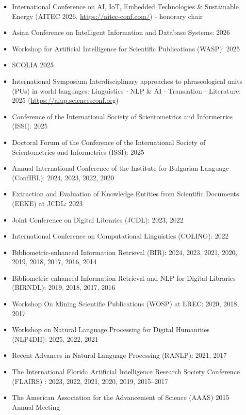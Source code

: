 \begin{itemize}
	\item International Conference on AI, IoT, Embedded Technologies \& Sustainable Energy (AITEC 2026, \url{https://aitec-conf.com/}) - honorary chair 
	\item Asian Conference on Intelligent Information and Database Systems: 2026
	\item Workshop for Artificial Intelligence for Scientific Publications (WASP): 2025 
    \item SCOLIA 2025
    \item International Symposium Interdisciplinary approaches to phraseological units (PUs) in world languages: Linguistics - NLP \& AI - Translation - Literature: 2025 (\url{https://aiup.sciencesconf.org})
    \item Conference of the International Society of Scientometrics and Informetrics (ISSI): 2025
    \item Doctoral Forum of the Conference of the International Society of Scientometrics and Informetrics (ISSI): 2025
     \item Annual International Conference of the Institute for Bulgarian Language (ConfIBL): 2024, 2023, 2022, 2020
     \item Extraction and Evaluation of Knowledge Entities from Scientific Documents (EEKE) at JCDL: 2023
     \item Joint Conference on Digital Libraries (JCDL): 2023, 2022
     \item International Conference on Computational Linguistics (COLING): 2022
    \item Bibliometric-enhanced Information Retrieval (BIR): 2024, 2023, 2021, 2020, 2019, 2018, 2017, 2016, 2014
    \item Bibliometric-enhanced Information Retrieval and NLP for Digital Libraries (BIRNDL): 2019, 2018, 2017, 2016
   \item Workshop On Mining Scientific Publications (WOSP) at LREC: 2020, 2018, 2017
   \item Workshop on Natural Language Processing for Digital Humanities (NLP4DH): 2025, 2022, 2021
   \item Recent Advances in Natural Language Processing (RANLP): 2021, 2017 
   \item The International Florida Artificial Intelligence Research Society Conference (FLAIRS) : 2023, 2022, 2021, 2020, 2019, 2015--2017
    \item The American Association for the Advancement of Science (AAAS) 2015 Annual Meeting

\end{itemize}
